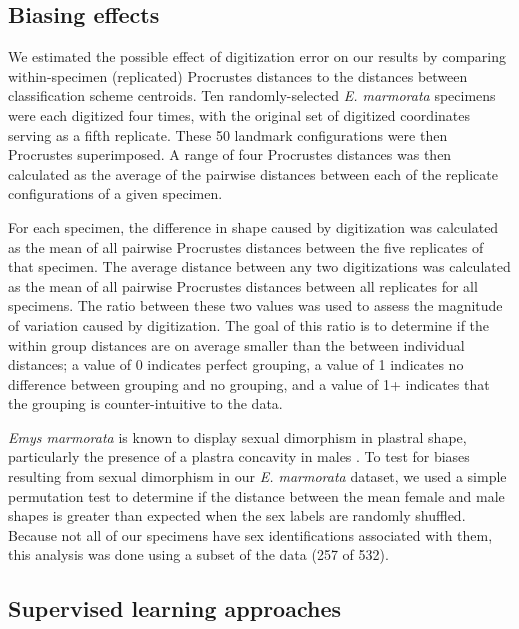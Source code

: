 \documentclass[fleqn,10pt,lineno]{wlpeerj} %
\begin{document}
\subsection*{Biasing effects}
We estimated the possible effect of digitization error \citep{Arnqvist1998,Cramon2007,Munoz-MunozF.2010} on our results by comparing within-specimen (replicated) Procrustes distances to the distances between classification scheme centroids. Ten randomly-selected \textit{E. marmorata} specimens were each digitized four times, with the original set of digitized coordinates serving as a fifth replicate. These 50 landmark configurations were then Procrustes superimposed. A range of four Procrustes distances was then calculated as the average of the pairwise distances between each of the replicate configurations of a given specimen.

For each specimen, the difference in shape caused by digitization was calculated as the mean of all pairwise Procrustes distances between the five replicates of that specimen. The average distance between any two digitizations was calculated as the mean of all pairwise Procrustes distances between all replicates for all specimens. The ratio between these two values was used to assess the magnitude of variation caused by digitization. The goal of this ratio is to determine if the within group distances are on average smaller than the between individual distances; a value of 0 indicates perfect grouping, a value of 1 indicates no difference between grouping and no grouping, and a value of 1+ indicates that the grouping is counter-intuitive to the data.

\textit{Emys marmorata} is known to display sexual dimorphism in plastral shape, particularly the presence of a plastra concavity in males \citep{Seeliger1945}. To test for biases resulting from sexual dimorphism in our \textit{E. marmorata} dataset, we used a simple permutation test to determine if the distance between the mean female and male shapes is greater than expected when the sex labels are randomly shuffled. Because not all of our specimens have sex identifications associated with them, this analysis was done using a subset of the data (257 of 532).


\subsection*{Supervised learning approaches}
\end{document}
